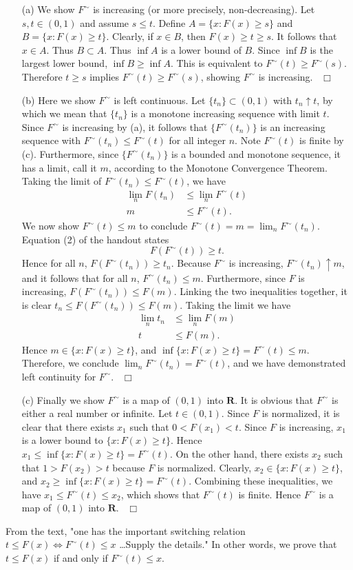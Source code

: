 \documentclass[letterpaper,10pt]{article}
\newcommand{\Ft}{F^\sim}
\def \R {\mathbf{R}}
\begin{document}
\begin{enumerate}
\item[(a)]
We show $\Ft$ is increasing (or more precisely, non-decreasing). Let $s,t \in (0,1)$ and assume $s \leq t$. 
Define $A = \{x : F(x) \geq s\}$ and $B = \{ x : F(x) \geq t\}$. Clearly, if $x \in B$, then $F(x) \geq t \geq s$. It follows that $x \in A$. 
Thus $B \subset A$. Thus $\inf A$ is a lower bound of $B$. Since $\inf B$ is the largest lower bound, $\inf B \geq \inf A$. This is equivalent to $\Ft(t) \geq \Ft(s)$. 
Therefore $t \geq s$ implies $\Ft(t) \geq \Ft(s)$, showing $\Ft$ is increasing.
\mbox{}~\hfill $\Box$
\item[(b)]
Here we show $\Ft$ is left continuous. 
Let $\{t_n\} \subset (0,1)$ with $t_n \uparrow t$, by which we mean that $\{t_n\}$ is a monotone increasing sequence with limit $t$. 
Since $\Ft$ is increasing by (a), it follows that $\{ \Ft(t_n)\}$ is an increasing sequence with $\Ft(t_n) \leq \Ft(t)$ for all integer $n$. Note $\Ft(t)$ is finite by (c).
Furthermore, since $\{ \Ft(t_n)\}$ is a bounded and monotone sequence, it has a limit, call it $m$, according to the Monotone Convergence Theorem. 
Taking the limit of $\Ft(t_n) \leq \Ft(t)$, we have
\begin{align*}
\lim_n F(t_n) &\leq \lim_n \Ft(t) \\
m &\leq \Ft(t) \text{.}
\end{align*}
We now show $\Ft(t) \leq m$ to conclude $\Ft(t) = m = \lim_n \Ft(t_n)$. Equation (2) of the handout states 
\[
F(\Ft(t)) \geq t \text{.}
\]
Hence for all $n$, $F(\Ft(t_n)) \geq t_n$. 
Because $\Ft$ is increasing, $\Ft(t_n) \uparrow m$, and it follows that for all $n$, $\Ft(t_n) \leq m$. 
Furthermore, since $F$ is increasing, $F(\Ft(t_n)) \leq F(m)$. Linking the two inequalities together, it is clear $t_n \leq F(\Ft(t_n)) \leq F(m)$.
Taking the limit we have
\begin{align*}
\lim_n t_n &\leq \lim_n F(m) \\
t &\leq F(m) \text{.}
\end{align*}
Hence $m \in \{x : F(x) \geq t\}$, and $\inf \{x : F(x) \geq t\} = \Ft(t) \leq m$. Therefore, we conclude $\lim_n \Ft(t_n) = \Ft(t)$, and we have demonstrated left continuity for $\Ft$.
\mbox{}~\hfill $\Box$
\item[(c)]
Finally we show $\Ft$ is a map of $(0,1)$ into $\R$.
It is obvious that $\Ft$ is either a real number or infinite.
Let $t \in (0,1)$. 
Since $F$ is normalized, it is clear that there exists $x_1$ such that $0< F(x_1) < t$. 
Since $F$ is increasing, $x_1$ is a lower bound to $\{x : F(x) \geq t\}$. Hence $x_1 \leq \inf \{x : F(x) \geq t\} = \Ft(t)$. 
On the other hand, there exists $x_2$ such that $1 > F(x_2) > t$ because $F$ is normalized. 
Clearly, $x_2 \in \{x : F(x) \geq t\}$, and $x_2 \geq \inf \{x : F(x) \geq t\} = \Ft(t)$. 
Combining these inequalities, we have $x_1 \leq \Ft(t) \leq x_2$, which shows that $\Ft(t)$ is finite. 
Hence $\Ft$ is a map of $(0,1)$ into $\R$.
\mbox{}~\hfill $\Box$
\end{enumerate}
From the text, "one has the important switching relation $t \leq F(x) \Leftrightarrow \Ft(t) \leq x$ \dots Supply the details." In other words, we prove that $t \leq F(x)$ if and only if $\Ft(t) \leq x$.
\end{document}
